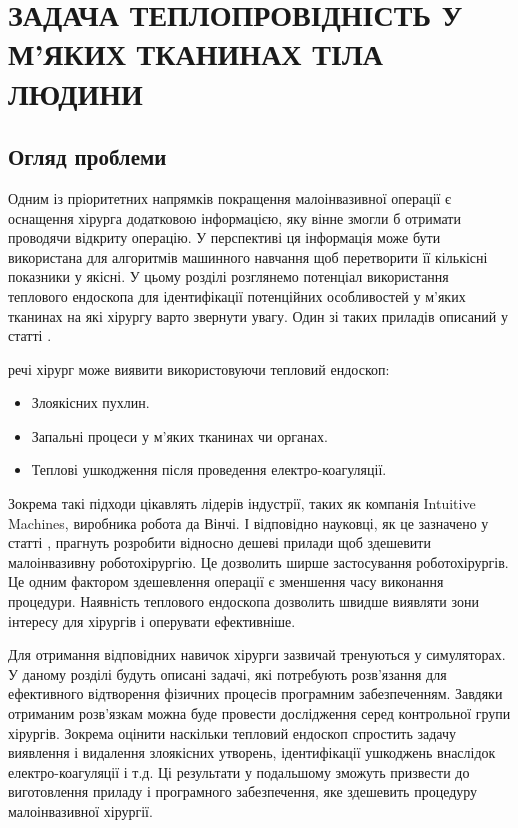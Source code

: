 \chapter{ЗАДАЧА ТЕПЛОПРОВІДНІСТЬ У М'ЯКИХ ТКАНИНАХ ТІЛА ЛЮДИНИ}

\nocite{bahvalov-et-al,tumor-thermal-model,lung-tumor-thermal-conductivity,database-tissue-properties} 

\section{Огляд проблеми}

Одним із пріоритетних напрямків покращення малоінвазивної операції є оснащення хірурга додатковою інформацією, яку
він не змогли б отримати проводячи відкриту операцію. У перспективі ця інформація може бути
використана для алгоритмів машинного навчання щоб перетворити її кількісні показники у якісні. У цьому розділі
розглянемо потенціал використання теплового ендоскопа для ідентифікації потенційних особливостей у м'яких тканинах на які
хірургу варто звернути увагу. Один зі таких приладів описаний у статті \cite{thermal-endoscope-concept}.

 речі хірург може виявити використовуючи тепловий ендоскоп:
\begin{itemize}
    \item Злоякісних пухлин.
    \item Запальні процеси у м'яких тканинах чи органах.
    \item Теплові ушкодження після проведення електро-коагуляції.
\end{itemize}

Зокрема такі підходи цікавлять лідерів індустрії, таких як компанія Intuitive Machines, виробника робота да Вінчі. І 
відповідно науковці, як це зазначено у статті \cite{thermal-endoscope-concept}, прагнуть розробити відносно дешеві 
прилади щоб здешевити малоінвазивну роботохірургію. Це дозволить ширше застосування роботохірургів. Це одним фактором 
здешевлення операції є зменшення часу виконання процедури. Наявність теплового ендоскопа дозволить швидше виявляти зони 
інтересу для хірургів і оперувати ефективніше.

Для отримання відповідних навичок хірурги зазвичай тренуються у симуляторах. У даному розділі будуть описані задачі, які
потребують розв'язання для ефективного відтворення фізичних процесів програмним забезпеченням. Завдяки отриманим 
розв'язкам можна буде провести дослідження серед контрольної групи хірургів. Зокрема оцінити наскільки тепловий ендоскоп 
спростить задачу виявлення і видалення злоякісних утворень, ідентифікації ушкоджень внаслідок електро-коагуляції і т.д. 
Ці результати у подальшому зможуть призвести до виготовлення приладу і програмного забезпечення, яке здешевить процедуру  
малоінвазивної хірургії.


